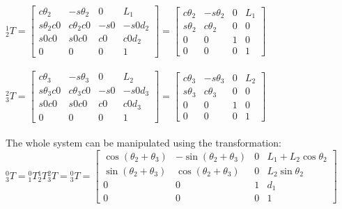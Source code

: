 \documentclass{article}
\begin{document}
${}^{1}_{2}T=
\begin{bmatrix}
c\theta_2 & -s\theta_2 & 0 & L_1\\
s\theta_2c0 & c\theta_2c0 & -s0 & -s0d_2\\
s0c0 & s0c0 & c0 & c0d_2\\
0 & 0 & 0 & 1
\end{bmatrix}=
\begin{bmatrix}
c\theta_2 & -s\theta_2 & 0 & L_1\\
s\theta_2 & c\theta_2 & 0 & 0\\
0 & 0 & 1 & 0\\
0 & 0 & 0 & 1
\end{bmatrix}$\\\\
${}^{2}_{3}T=
\begin{bmatrix}
c\theta_3 & -s\theta_3 & 0 & L_2\\
s\theta_3c0 & c\theta_3c0 & -s0 & -s0d_3\\
s0c0 & s0c0 & c0 & c0d_3\\
0 & 0 & 0 & 1
\end{bmatrix}=
\begin{bmatrix}
c\theta_3 & -s\theta_3 & 0 & L_2\\
s\theta_3 & c\theta_3 & 0 & 0\\
0 & 0 & 1 & 0\\
0 & 0 & 0 & 1
\end{bmatrix}$\\\\
The whole system can be manipulated using the transformation:\\
${}^{0}_{3}T={}^{0}_{1}T{}^{1}_{2}T{}^{2}_{3}T = 
{}^0_3T =
\begin{bmatrix}
\cos(\theta_2+\theta_3) & -\sin(\theta_2+\theta_3) & 0 &
L_1 + L_2\cos\theta_2
\\[4pt]
\sin(\theta_2+\theta_3) & \cos(\theta_2+\theta_3) & 0 &
L_2\sin\theta_2
\\[4pt]
0 & 0 & 1 & d_1
\\[4pt]
0 & 0 & 0 & 1
\end{bmatrix}
$ \newpage
\end{document}
